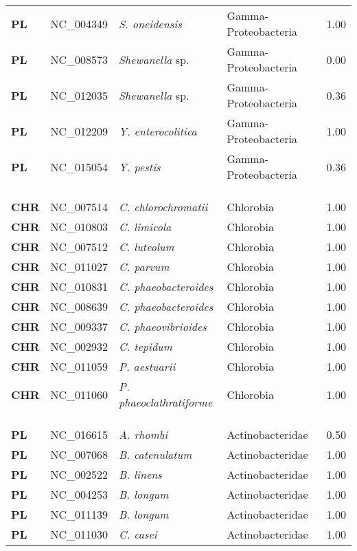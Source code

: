 \begin{adjustwidth}{-3cm}{2cm}
{\begin{supertabular}{>{\bfseries}l|p{0.1\textwidth}p{0.14\textwidth}l|l}
PL & NC\_004349 & \textit{S. oneidensis} & Gamma-Proteobacteria & 1.00\\
PL & NC\_008573 & \textit{Shewanella} sp. & Gamma-Proteobacteria & 0.00\\
PL & NC\_012035 & \textit{Shewanella} sp. & Gamma-Proteobacteria & 0.36\\
PL & NC\_012209 & \textit{Y. enterocolitica} & Gamma-Proteobacteria & 1.00\\
PL & NC\_015054 & \textit{Y. pestis} & Gamma-Proteobacteria & 0.36\\
\\
\\
\hline\\
CHR & NC\_007514 & \textit{C. chlorochromatii} & Chlorobia & 1.00\\
CHR & NC\_010803 & \textit{C. limicola} & Chlorobia & 1.00\\
CHR & NC\_007512 & \textit{C. luteolum} & Chlorobia & 1.00\\
CHR & NC\_011027 & \textit{C. parvum} & Chlorobia & 1.00\\
CHR & NC\_010831 & \textit{C. phaeobacteroides} & Chlorobia & 1.00\\
CHR & NC\_008639 & \textit{C. phaeobacteroides} & Chlorobia & 1.00\\
CHR & NC\_009337 & \textit{C. phaeovibrioides} & Chlorobia & 1.00\\
CHR & NC\_002932 & \textit{C. tepidum} & Chlorobia & 1.00\\
CHR & NC\_011059 & \textit{P. aestuarii} & Chlorobia & 1.00\\
CHR & NC\_011060 & \textit{P. phaeoclathratiforme} & Chlorobia & 1.00\\
\\
\\
\hline\\
PL & NC\_016615 & \textit{A. rhombi} & Actinobacteridae & 0.50\\
PL & NC\_007068 & \textit{B. catenulatum} & Actinobacteridae & 1.00\\
PL & NC\_002522 & \textit{B. linens} & Actinobacteridae & 1.00\\
PL & NC\_004253 & \textit{B. longum} & Actinobacteridae & 1.00\\
PL & NC\_011139 & \textit{B. longum} & Actinobacteridae & 1.00\\
PL & NC\_011030 & \textit{C. casei} & Actinobacteridae & 1.00\\

\end{supertabular}}
\end{adjustwidth}

